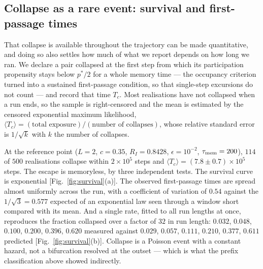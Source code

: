 \documentclass[aps,pre,twocolumn,superscriptaddress,floatfix,longbibliography]{revtex4-2}
\begin{document}
\subsection[Collapse as a rare event: survival and first-passage times]{Collapse as a rare event: survival and first-passage times}
\label{sec:survival}

That collapse is available throughout the trajectory can be made
quantitative, and doing so also settles how much of what we report depends on how
long we ran. We declare a pair collapsed at the first step from which its
participation propensity stays below $p^{*}/2$ for a whole memory time --- the
occupancy criterion turned into a sustained first-passage condition, so that
single-step excursions do not count --- and record that time $T_c$. Most
realisations have not collapsed when a run ends, so the sample is right-censored
and the mean is estimated by the censored exponential maximum likelihood,
$\langle T_c\rangle=(\text{total exposure})/(\text{number of collapses})$, whose
relative standard error is $1/\sqrt{k}$ with $k$ the number of collapses.

At the reference point ($L=2$, $c=0.35$, $R_I=0.8428$, $\epsilon=10^{-2}$,
$\tau_{\rm mem}=200$), $114$ of $500$ realisations collapse within
$2\times10^{5}$ steps and $\langle T_c\rangle=(7.8\pm0.7)\times10^{5}$ steps.
The escape is memoryless, by three independent tests. The survival curve is
exponential [Fig.~\ref{fig:survival}(a)]. The observed first-passage times are
spread almost uniformly across the run, with a coefficient of variation of
$0.54$ against the $1/\sqrt{3}=0.577$ expected of an exponential law seen
through a window short compared with its mean. And a single rate, fitted to all
run lengths at once, reproduces the fraction collapsed over a factor of $32$ in
run length: $0.032$, $0.048$, $0.100$, $0.200$, $0.396$, $0.620$ measured
against $0.029$, $0.057$, $0.111$, $0.210$, $0.377$, $0.611$ predicted
[Fig.~\ref{fig:survival}(b)]. Collapse is a Poisson event with a constant
hazard, not a bifurcation resolved at the outset --- which is what the prefix
classification above showed indirectly.
\end{document}
